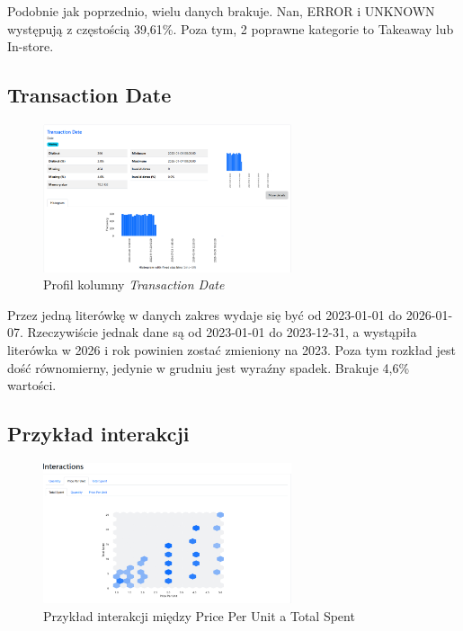 \documentclass[a4paper,12pt]{article}
\begin{document}
Podobnie jak poprzednio, wielu danych brakuje. Nan, ERROR i UNKNOWN występują z częstością 39,61\%. Poza tym, 2 poprawne kategorie to Takeaway lub In-store.

\subsection{Transaction Date}

\begin{figure}[H]
  \centering
  \includegraphics[width=0.65\textwidth]{images/py_8.png}
  \caption{Profil kolumny \textit{Transaction Date}}
\end{figure}

Przez jedną literówkę w danych zakres wydaje się być od 2023-01-01 do 2026-01-07. Rzeczywiście jednak dane są od 2023-01-01 do 2023-12-31, a wystąpiła literówka w 2026 i rok powinien zostać zmieniony na 2023. Poza tym rozkład jest dość równomierny, jedynie w grudniu jest wyraźny spadek. Brakuje 4,6\% wartości.

\subsection{Przykład interakcji}

\begin{figure}[H]
  \centering
  \includegraphics[width=0.65\textwidth]{images/py_interactions_example.png}
  \caption{Przykład interakcji między Price Per Unit a Total Spent}
\end{figure}
\end{document}
